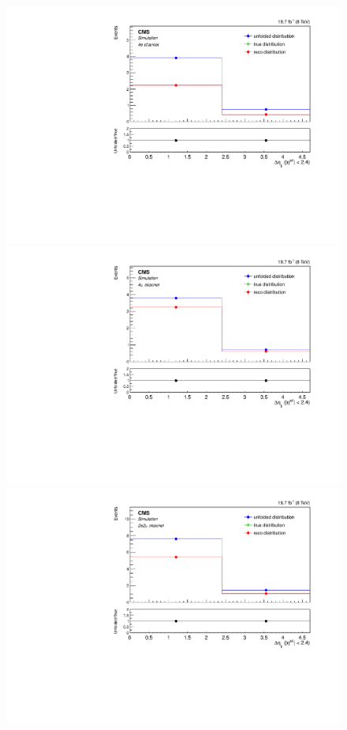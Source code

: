 \begin{figure}[hbtp]
\begin{center}
     \includegraphics[width=0.8\cmsFigWidth]{Figures/Unfolding/MCTests/CentralDeta_ZZTo4e_PowMatrix_PowDistr_FullSample_fr}     
    \includegraphics[width=0.8\cmsFigWidth]{Figures/Unfolding/MCTests/CentralDeta_ZZTo4m_PowMatrix_PowDistr_FullSample_fr}     
    \includegraphics[width=0.8\cmsFigWidth]{Figures/Unfolding/MCTests/CentralDeta_ZZTo2e2m_PowMatrix_PowDistr_FullSample_fr}      

\end{center}
\end{figure}
